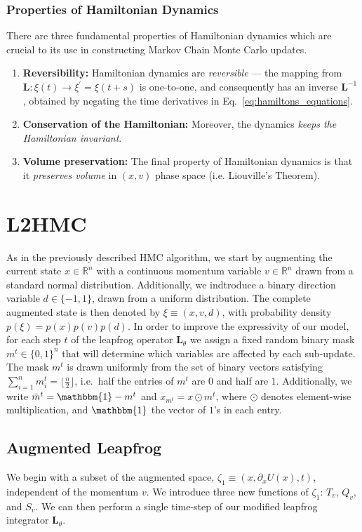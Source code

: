 \documentclass[../main.tex]{subfiles}
\begin{document}
\subsubsection{Properties of Hamiltonian Dynamics}
%
There are three fundamental properties of Hamiltonian dynamics which are crucial to its use in constructing Markov
Chain Monte Carlo updates.
%
\begin{enumerate}
    \item \textbf{Reversibility:} Hamiltonian dynamics are \textit{reversible}
        --- the mapping from $\mathbf{L}: \xi(t) \rightarrow \xi^{\prime} =
        \xi(t + s)$ is one-to-one, and consequently has an inverse
        $\mathbf{L}^{-1}$, obtained by negating the time derivatives in
        Eq.~\ref{eq:hamiltons_equations}.
    \item \textbf{Conservation of the Hamiltonian:} Moreover, the dynamics
        \textit{keeps the Hamiltonian invariant}.
    \item \textbf{Volume preservation:} The final property of Hamiltonian
        dynamics is that it \textit{preserves volume} in $(x, v)$ phase space
        (i.e. Liouville's Theorem).
\end{enumerate}
%
\section{L2HMC}%
\label{sec:l2hmc_l2hmc}
As in the previously described HMC algorithm, we start by augmenting the current state $x \in \mathbb{R}^n$ with a
continuous momentum variable $v \in \mathbb{R}^{n}$ drawn from a standard normal distribution.
%
Additionally, we indtroduce a binary direction variable $d \in \{ -1, 1\}$, drawn from a uniform distribution. 
%
The complete augmented state is then denoted by $\xi \equiv (x, v, d)$, with probability density $p(\xi) = p(x) p(v)
p(d)$.
%
In order to improve the expressivity of our model, for each step $t$ of the leapfrog operator $\mathbf{L}_{\theta}$ we
assign a fixed random binary mask $m^{t} \in{\{0, 1\}}^n$ that will determine which variables are affected by each
sub-update.
%
The mask $m^t$ is drawn uniformly from the set of binary vectors satisfying $\sum_{i=1}^{n} m_{i}^{t} = \lfloor
\frac{n}{2}\rfloor$, i.e.\ half the entries of $m^t$ are $0$ and half are $1$.
%
Additionally, we write $\bar m^{t} = \mathbbm{1} - m^{t}$ and $x_{m^t} = x \odot m^{t}$, where $\odot$ denotes
element-wise multiplication, and $\mathbbm{1}$ the vector of $1$'s in each entry.
%
\subsection{Augmented Leapfrog}
%
We begin with a subset of the augmented space, $\zeta_1 \equiv (x, \partial_{x} U(x), t)$, independent of the momentum
$v$.
%
We introduce three new functions of $\zeta_1$: $T_v$, $Q_v$, and $S_v$.
%
We can then perform a single time-step of our modified leapfrog integrator $\mathbf{L}_{\theta}$.
%
\end{document}
